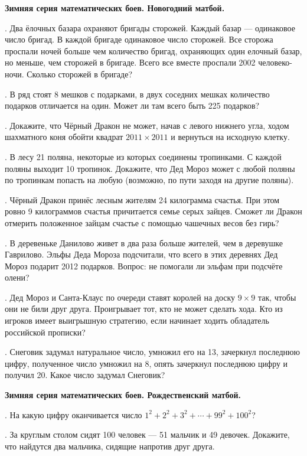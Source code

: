 \centerline{\bf Зимняя серия математических боев. Новогодний матбой.}


. Два ёлочных базара охраняют бригады сторожей. Каждый
базар --- одинаковое число бригад. В каждой бригаде одинаковое число
сторожей. Все сторожа проспали ночей больше чем количество бригад,
охраняющих один елочный базар, но меньше, чем сторожей в бригаде.
Всего все вместе проспали 2002 человеко-ночи. Сколько сторожей в бригаде?

.  В ряд стоят 8 мешков с подарками, в двух соседних мешках количество
подарков отличается на один. Может ли там всего быть 225 подарков?

. Докажите, что Чёрный Дракон не может, начав с левого 
нижнего угла, ходом шахматного коня обойти квадрат $2011 \times 2011$ 
и вернуться на исходную клетку. 

. В лесу 21 поляна, некоторые из которых соединены тропинками.
С каждой поляны выходит 10  тропинок. Докажите, что Дед Мороз может
с любой поляны по тропинкам попасть на любую (возможно, по пути заходя
на другие поляны).

. Чёрный Дракон принёс лесным жителям 24 килограмма счастья. 
При этом ровно 9 килограммов счастья причитается семье серых зайцев. 
Сможет ли Дракон отмерить положенное зайцам счастье с помощью чашечных весов без гирь? 

.  В деревеньке Данилово живет в два раза больше жителей, чем в деревушке Гаврилово. 
Эльфы Деда Мороза подсчитали, что всего в этих деревнях Дед Мороз подарит 2012 подарков. 
Вопрос: не помогали ли эльфам при подсчёте олени? 

.  Дед Мороз и Санта-Клаус  по очереди ставят королей на доску $9 \times 9$ так, 
чтобы они не били друг друга. Проигрывает тот, кто не может сделать хода. 
Кто из игроков имеет выигрышную стратегию, если начинает ходить обладатель российской прописки?

.  Снеговик задумал натуральное число, умножил его на 13, зачеркнул 
последнюю цифру, полученное число умножил на 8, опять зачеркнул последнюю 
цифру и получил 20. Какое число задумал Снеговик? 

\centerline{\bf Зимняя серия математических боев. Рождественский матбой.}

. На какую цифру оканчивается число $1^2+2^2+3^2+ \cdots
+{99}^2+{100}^2$?

. За круглым столом сидят 100 человек --- 51 мальчик и 49 девочек.
Докажите, что найдутся два мальчика, сидящие напротив друг друга.

